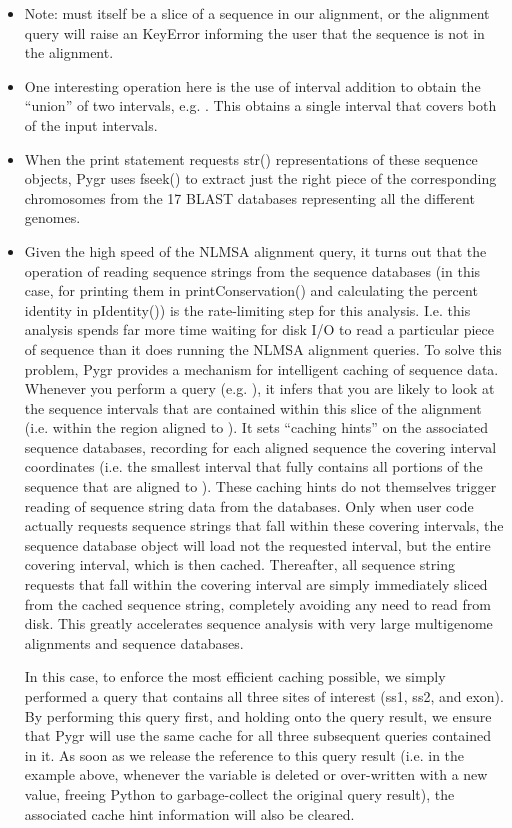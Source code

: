 \documentclass{howto}
\begin{document}
\begin{itemize}
\item
Note:  must itself be a slice of a sequence in our alignment, 
or the alignment query  will raise an KeyError informing
the user that the sequence  is not in the alignment.

\item
One interesting operation here is the use of interval
addition to obtain the ``union'' of two intervals, e.g. .
This obtains a single interval that covers both of the input intervals.

\item
When the print  statement requests str() representations of these sequence objects, Pygr uses fseek() to extract just the right piece of the corresponding chromosomes from the 17 BLAST databases representing all the different genomes.

\item
Given the high speed of the NLMSA alignment query, it turns out that the
operation of reading sequence strings from the sequence databases (in this
case, for printing them in printConservation() and calculating the percent identity
in pIdentity()) is the rate-limiting step for this analysis.  I.e. this analysis
spends far more time waiting for disk I/O to read a particular piece of sequence 
than it does running the NLMSA alignment queries.  To solve this problem, Pygr
provides a mechanism for intelligent caching of sequence data.  Whenever you
perform a query (e.g. ), it infers that you are likely to look
at the sequence intervals that are contained within this slice of the alignment
(i.e. within the region aligned to ).  It sets ``caching hints'' on the
associated sequence databases, recording for each aligned sequence
the covering interval coordinates (i.e. the smallest interval that fully contains
all portions of the sequence that are aligned to ).  These caching hints
do not themselves trigger reading of sequence string data from the databases.  Only
when user code actually requests sequence strings that fall within these covering
intervals, the sequence database object will load not the requested interval, but
the entire covering interval, which is then cached.  Thereafter, all sequence
string requests that fall within the covering interval are simply immediately sliced
from the cached sequence string, completely avoiding any need to read from disk.
This greatly accelerates sequence analysis with very large multigenome alignments
and sequence databases.  

In this case, to enforce the most efficient caching possible, we simply performed
a query that contains all three sites of interest (ss1, ss2, and exon).  By performing
this query first, and holding onto the query result, we ensure that Pygr will
use the same cache for all three subsequent queries contained in it.  As soon
as we release the reference to this query result (i.e. in the example above,
whenever the variable  is deleted or over-written with a new value,
freeing Python to garbage-collect the original query result), the associated 
cache hint information will also be cleared.

\end{itemize}
\end{document}
